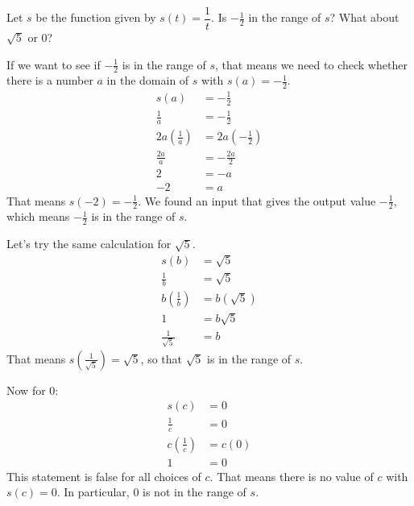 \documentclass[nooutcomes]{ximera}
\begin{document}
	
	\begin{example}

		Let $s$ be the function given by $s(t) = \dfrac{1}{t}$. Is $-\frac{1}{2}$ in the range of $s$? What about $\sqrt{5}$ or $0$?

		\begin{explanation}
		
			If we want to see if $-\frac{1}{2}$ is in the range of $s$, that means we need to check whether there is a number $a$ in the domain
			of $s$ with $s(a) = -\frac{1}{2}$. 
			\begin{align*}
				s(a) &= -\frac{1}{2}\\
				\frac{1}{a} &= -\frac{1}{2}\\
				2a \left( \frac{1}{a} \right) &= 2a \left( - \frac{1}{2} \right)\\
				\frac{2a}{a} &= -\frac{2a}{2}\\
				2 &= -a \\			
				-2 &= a
			\end{align*}
			That means $s(-2) = -\frac{1}{2}$. We found an input that gives the output value $-\frac{1}{2}$, which means $-\frac{1}{2}$ is in 
			the range of $s$.

			Let's try the same calculation for $\sqrt{5}$.
			\begin{align*}
				s(b) &= \sqrt{5}\\
				\frac{1}{b} &= \sqrt{5}\\
				b \left( \frac{1}{b} \right) &= b \left( \sqrt{5} \right)\\
				1 &= b\sqrt{5}\\
				\frac{1}{\sqrt{5}} &= b
			\end{align*}
			That means $s\left(\frac{1}{\sqrt{5}} \right) = \sqrt{5}$, so that $\sqrt{5}$ is in the range of $s$.
				
			Now for $0$:
			\begin{align*}
				s(c) &= 0\\
				\frac{1}{c} &= 0\\
				c \left( \frac{1}{c} \right) &= c \left( 0 \right)\\
				1 &= 0
			\end{align*}
			This statement is false for all choices of $c$. That means there is no value of $c$ with $s(c)=0$. In particular, $0$ is not in the range of $s$.	
		\end{explanation}
	\end{example}
\end{document}
